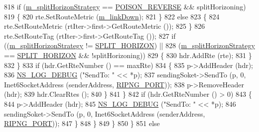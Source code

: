 \begin{DoxyCode}
818                       \textcolor{keywordflow}{if} (\hyperlink{classns3_1_1RipNg_a2aaaf4747380a0960cc48cb04ae99a1a}{m\_splitHorizonStrategy} == 
      \hyperlink{classns3_1_1RipNg_a2baa3148870b411bccfe688079fb40a7a68187e765b02506b3891b87a513fac2f}{POISON\_REVERSE} && splitHorizoning)
819                         \{
820                           rte.SetRouteMetric (\hyperlink{classns3_1_1RipNg_a6752c1bb1fc0909f0493033d426f2b92}{m\_linkDown});
821                         \}
822                       \textcolor{keywordflow}{else}
823                         \{
824                           rte.SetRouteMetric (rtIter->first->GetRouteMetric ());
825                         \}
826                       rte.SetRouteTag (rtIter->first->GetRouteTag ());
827                       \textcolor{keywordflow}{if} ((\hyperlink{classns3_1_1RipNg_a2aaaf4747380a0960cc48cb04ae99a1a}{m\_splitHorizonStrategy} != 
      \hyperlink{classns3_1_1RipNg_a2baa3148870b411bccfe688079fb40a7a65efd4b3a6b5b8be8e16038fec0cad4e}{SPLIT\_HORIZON}) ||
828                           (\hyperlink{classns3_1_1RipNg_a2aaaf4747380a0960cc48cb04ae99a1a}{m\_splitHorizonStrategy} == 
      \hyperlink{classns3_1_1RipNg_a2baa3148870b411bccfe688079fb40a7a65efd4b3a6b5b8be8e16038fec0cad4e}{SPLIT\_HORIZON} && !splitHorizoning))
829                         \{
830                           hdr.AddRte (rte);
831                         \}
832                     \}
833                   \textcolor{keywordflow}{if} (hdr.GetRteNumber () == maxRte)
834                     \{
835                       p->AddHeader (hdr);
836                       \hyperlink{group__logging_ga413f1886406d49f59a6a0a89b77b4d0a}{NS\_LOG\_DEBUG} (\textcolor{stringliteral}{"SendTo: "} << *p);
837                       sendingSoket->SendTo (p, 0, Inet6SocketAddress (senderAddress, 
      \hyperlink{ripng_8cc_a86ce7fe00a995035f236d2463a7b761f}{RIPNG\_PORT}));
838                       p->RemoveHeader (hdr);
839                       hdr.ClearRtes ();
840                     \}
841                 \}
842               \textcolor{keywordflow}{if} (hdr.GetRteNumber () > 0)
843                 \{
844                   p->AddHeader (hdr);
845                   \hyperlink{group__logging_ga413f1886406d49f59a6a0a89b77b4d0a}{NS\_LOG\_DEBUG} (\textcolor{stringliteral}{"SendTo: "} << *p);
846                   sendingSoket->SendTo (p, 0, Inet6SocketAddress (senderAddress, 
      \hyperlink{ripng_8cc_a86ce7fe00a995035f236d2463a7b761f}{RIPNG\_PORT}));
847                 \}
848             \}
849         \}
850     \}
851   \textcolor{keywordflow}{else}

\end{DoxyCode}
